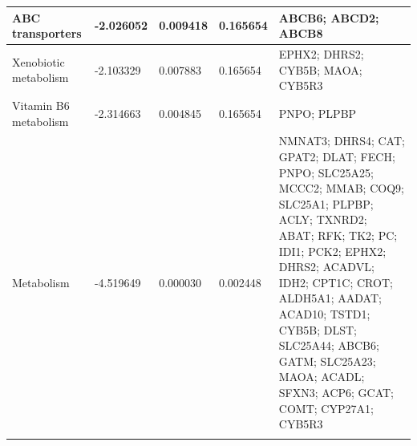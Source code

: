\documentclass[12pt]{article}
\begin{document}
\begin{longtable}{p{5cm} p{2cm} p{1.5cm} p{1.5cm} p{7cm}}
    \hline
    ABC transporters & -2.026052 & 0.009418 & 0.165654 & ABCB6; ABCD2; ABCB8 \\
    \hline
    Xenobiotic metabolism & -2.103329 & 0.007883 & 0.165654 & EPHX2; DHRS2; CYB5B; MAOA; CYB5R3 \\
    \hline
    Vitamin B6 metabolism & -2.314663 & 0.004845 & 0.165654 & PNPO; PLPBP \\
    \hline
    Metabolism & -4.519649 & 0.000030 & 0.002448 & NMNAT3; DHRS4; CAT; GPAT2; DLAT; FECH; PNPO; SLC25A25; MCCC2; MMAB; COQ9; SLC25A1; PLPBP; ACLY; TXNRD2; ABAT; RFK; TK2; PC; IDI1; PCK2; EPHX2; DHRS2; ACADVL; IDH2; CPT1C; CROT; ALDH5A1; AADAT; ACAD10; TSTD1; CYB5B; DLST; SLC25A44; ABCB6; GATM; SLC25A23; MAOA; ACADL; SFXN3; ACP6; GCAT; COMT; CYP27A1; CYB5R3 \\
    \label{tab:y622_mito_genes}
\end{longtable}
\clearpage
\end{document}
